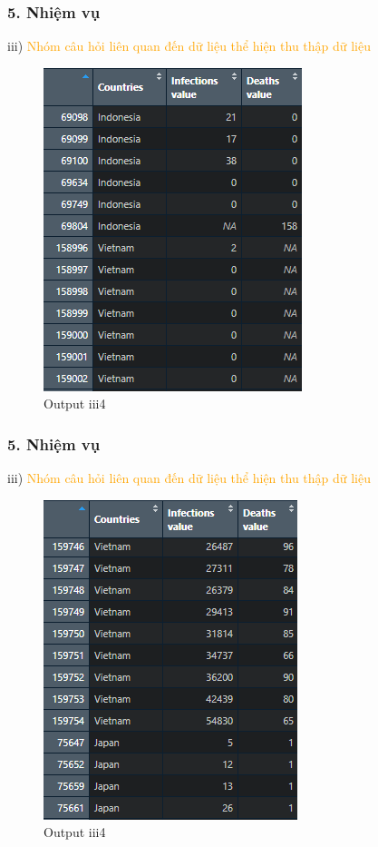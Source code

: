 \documentclass[english,10pt,table]{beamer}
\begin{document}
\begin{frame}[fragile]
\frametitle{5.  Nhiệm vụ}
	iii) \textcolor{orange}{Nhóm câu hỏi liên quan đến dữ liệu thể hiện thu thập dữ liệu}\\%
	\begin{figure}[h!]
	\begin{center}
		    \includegraphics[scale = 0.5]{Images/III/iii4.1.png}
		     \caption{Output iii4}
		\end{center}
		\end{figure}
\end{frame}

\begin{frame}[fragile]
\frametitle{5.  Nhiệm vụ}
	iii) \textcolor{orange}{Nhóm câu hỏi liên quan đến dữ liệu thể hiện thu thập dữ liệu}\\%
	\begin{figure}[h!]
	\begin{center}
		    \includegraphics[scale = 0.5]{Images/III/iii4.2.png}
		     \caption{Output iii4}
		\end{center}
		\end{figure}
\end{frame}
\end{document}
